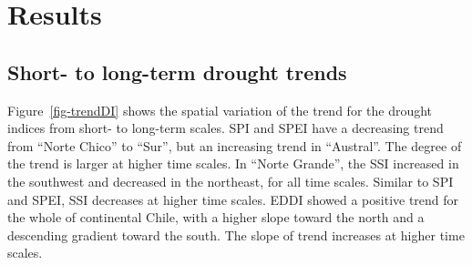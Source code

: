 \documentclass[
  authoryear,
  preprint,
  3p,
  onecolumn]{elsarticle}
\begin{document}
\section{Results}\label{results}

\subsection{Short- to long-term drought
trends}\label{short--to-long-term-drought-trends-1}

Figure~\ref{fig-trendDI} shows the spatial variation of the trend for
the drought indices from short- to long-term scales. SPI and SPEI have a
decreasing trend from ``Norte Chico'' to ``Sur'', but an increasing
trend in ``Austral''. The degree of the trend is larger at higher time
scales. In ``Norte Grande'', the SSI increased in the southwest and
decreased in the northeast, for all time scales. Similar to SPI and
SPEI, SSI decreases at higher time scales. EDDI showed a positive trend
for the whole of continental Chile, with a higher slope toward the north
and a descending gradient toward the south. The slope of trend increases
at higher time scales.

\blandscape
\end{document}
